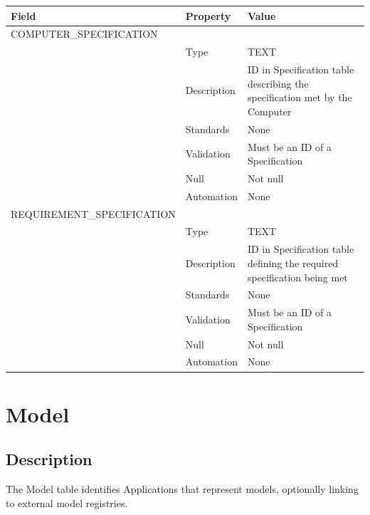 \begin{longtable}[]{@{}
  >{\raggedright\arraybackslash}p{}
  >{\raggedright\arraybackslash}p{}
  >{\raggedright\arraybackslash}p{}@{}}
\toprule\noalign{}
\begin{minipage}[b]{\linewidth}\raggedright
Field
\end{minipage} & \begin{minipage}[b]{\linewidth}\raggedright
Property
\end{minipage} & \begin{minipage}[b]{\linewidth}\raggedright
Value
\end{minipage} \\
\midrule\noalign{}
\endhead
\bottomrule\noalign{}
\endlastfoot
COMPUTER\_SPECIFICATION & & \\
& Type & TEXT \\
& Description & ID in Specification table describing the specification
met by the Computer \\
& Standards & None \\
& Validation & Must be an ID of a Specification \\
& Null & Not null \\
& Automation & None \\
REQUIREMENT\_SPECIFICATION & & \\
& Type & TEXT \\
& Description & ID in Specification table defining the required
specification being met \\
& Standards & None \\
& Validation & Must be an ID of a Specification \\
& Null & Not null \\
& Automation & None \\
\end{longtable}

\section{Model}\label{model}

\subsection{Description}\label{description-18}

The Model table identifies Applications that represent models,
optionally linking to external model registries.

